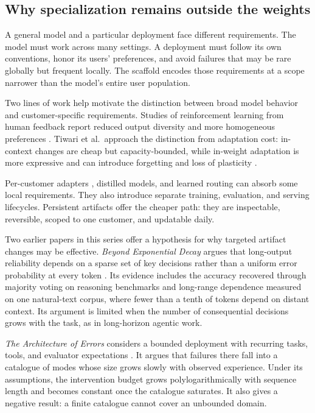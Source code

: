 \documentclass[
  11pt,
]{article}
\begin{document}
\subsection{Why specialization remains outside the weights}\label{sec:why}

A general model and a particular deployment face different requirements. The model must work across many settings. A deployment must follow its own conventions, honor its users' preferences, and avoid failures that may be rare globally but frequent locally. The scaffold encodes those requirements at a scope narrower than the model's entire user population.

Two lines of work help motivate the distinction between broad model behavior and customer-specific requirements. Studies of reinforcement learning from human feedback report reduced output diversity and more homogeneous preferences \cite{kirk2024understanding, padmakumar2023diversity}. Tiwari et al.~approach the distinction from adaptation cost: in-context changes are cheap but capacity-bounded, while in-weight adaptation is more expressive and can introduce forgetting and loss of plasticity \cite{tiwari2026fastandslow, dohare2024loss}.

Per-customer adapters \cite{hu2021lora}, distilled models, and learned routing can absorb some local requirements. They also introduce separate training, evaluation, and serving lifecycles. Persistent artifacts offer the cheaper path: they are inspectable, reversible, scoped to one customer, and updatable daily.

Two earlier papers in this series offer a hypothesis for why targeted artifact changes may be effective. \emph{Beyond Exponential Decay} argues that long-output reliability depends on a sparse set of key decisions rather than a uniform error probability at every token \cite{arbuzov2025beyond}. Its evidence includes the accuracy recovered through majority voting on reasoning benchmarks and long-range dependence measured on one natural-text corpus, where fewer than a tenth of tokens depend on distant context. Its argument is limited when the number of consequential decisions grows with the task, as in long-horizon agentic work.

\emph{The Architecture of Errors} considers a bounded deployment with recurring tasks, tools, and evaluator expectations \cite{arbuzov2026architecture}. It argues that failures there fall into a catalogue of modes whose size grows slowly with observed experience. Under its assumptions, the intervention budget grows polylogarithmically with sequence length and becomes constant once the catalogue saturates. It also gives a negative result: a finite catalogue cannot cover an unbounded domain.
\end{document}
